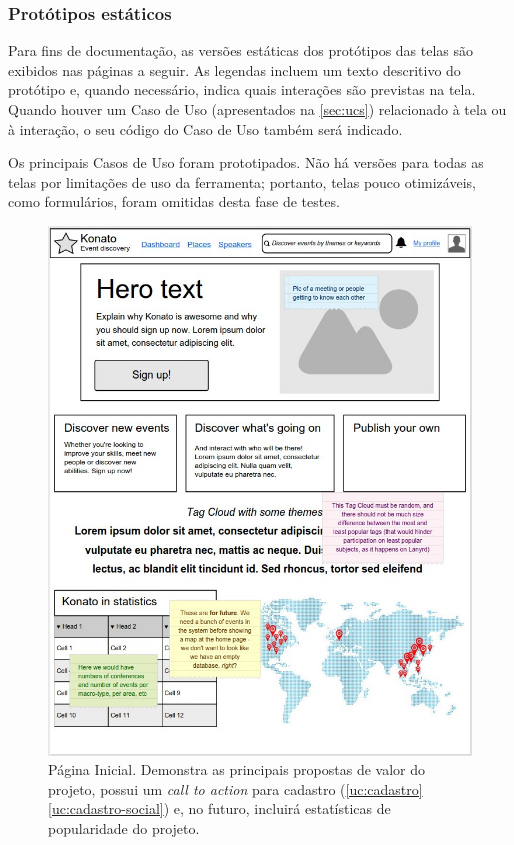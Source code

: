\documentclass[12pt,a4paper,twoside,hyphens,english,brazil]{abntex2}
\begin{document}
{\subsubsection{Protótipos estáticos}
Para fins de documentação, as versões estáticas dos protótipos das telas são exibidos nas páginas a seguir. As legendas incluem um texto descritivo do protótipo e, quando necessário, indica quais interações são previstas na tela. Quando houver um Caso de Uso (apresentados na \autoref{sec:ucs}) relacionado à tela ou à interação, o seu código do Caso de Uso também será indicado.

Os principais Casos de Uso foram prototipados. Não há versões para todas as telas por limitações de uso da ferramenta; portanto, telas pouco otimizáveis, como formulários, foram omitidas desta fase de testes.

\begin{figure}[hb]
\centering
	\includegraphics[width=0.85\linewidth]{imagens/prototipos/1-0_Home.jpg}
	\caption[Página Inicial]{Página Inicial. Demonstra as principais propostas de valor do projeto, possui um \emph{call to action}\footnotemark{} para cadastro (\ref{uc:cadastro} \ref{uc:cadastro-social}) e, no futuro, incluirá estatísticas de popularidade do projeto.}
	\label{prot:home}
\end{figure}

}
\end{document}
